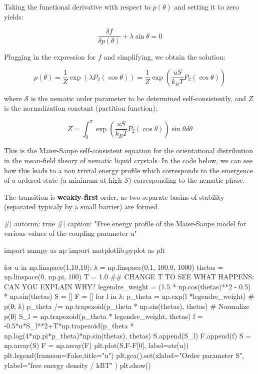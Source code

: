 \documentclass[
  letterpaper,
  enabledeprecatedfontcommands]{report}
\newenvironment{Shaded}{\begin{snugshade}}{\end{snugshade}}
\newcommand{\NormalTok}[1]{\textcolor[rgb]{0.00,0.23,0.31}{#1}}
\begin{document}
Taking the functional derivative with respect to \(p(\theta)\) and
setting it to zero yields:

\[
\frac{\delta f}{\delta p(\theta)} + \lambda \sin\theta = 0
\]

Plugging in the expression for \(f\) and simplifying, we obtain the
solution:

\[
p(\theta) = \frac{1}{Z} \exp\left( \lambda P_2(\cos\theta) \right)= \frac{1}{Z} \exp\left( \frac{u S}{k_B T} P_2(\cos\theta) \right)
\]

where \(\mathcal{S}\) is the nematic order parameter to be determined
self-consistently, and \(Z\) is the normalization constant (partition
function):

\[
Z = \int_0^\pi \exp\left( \frac{u S}{k_B T} P_2(\cos\theta) \right) \sin\theta d\theta
\]

This is the Maier-Saupe self-consistent equation for the orientational
distribution in the mean-field theory of nematic liquid crystals. In the
code below, we can see how this leads to a non trivial energy profile
which corresponds to the emergence of a ordered state (a minimum at high
\(\mathcal{S}\)) corresponding to the nematic phase.

The transition is \textbf{weakly-first} order, as two separate basins of
stability (separated typicaly by a small barrier) are formed.

\begin{Shaded}
\begin{Highlighting}[]
\NormalTok{\#| autorun: true}
\NormalTok{\#| caption: "Free energy profile of the Maier{-}Saupe model for various values of the coupling parameter u"}

\NormalTok{import numpy as np}
\NormalTok{import matplotlib.pyplot as plt}

\NormalTok{for u in np.linspace(1,10,10):}
\NormalTok{    λ = np.linspace(0.1, 100.0, 1000)}
\NormalTok{    thetas = np.linspace(0, np.pi, 100)}
\NormalTok{    T = 1.0 \#\# CHANGE T TO SEE WHAT HAPPENS: CAN YOU EXPLAIN WHY?}
\NormalTok{    legendre\_weight = (1.5 * np.cos(thetas)**2 {-} 0.5) * np.sin(thetas)}
\NormalTok{    S = []}
\NormalTok{    F = []}
\NormalTok{    for l in λ:}
\NormalTok{        p\_theta = np.exp(l *legendre\_weight)  \# p(θ; λ)}
\NormalTok{        p\_theta /= np.trapezoid(p\_theta * np.sin(thetas), thetas)  \# Normalize p(θ)}
\NormalTok{        S\_l = np.trapezoid(p\_theta * legendre\_weight, thetas)}
\NormalTok{        f = {-}0.5*u*S\_l**2+T*np.trapezoid(p\_theta * np.log(4*np.pi*p\_theta)*np.sin(thetas), thetas)}
\NormalTok{        S.append(S\_l)}
\NormalTok{        F.append(f)}
\NormalTok{    S = np.array(S)}
\NormalTok{    F = np.array(F)}
\NormalTok{    plt.plot(S,F{-}F[0], label=str(u))}
\NormalTok{plt.legend(frameon=False,title="u")}
\NormalTok{plt.gca().set(xlabel="Order parameter S", ylabel="free energy density / kBT" )}
\NormalTok{plt.show()}
\end{Highlighting}
\end{Shaded}
\end{document}
